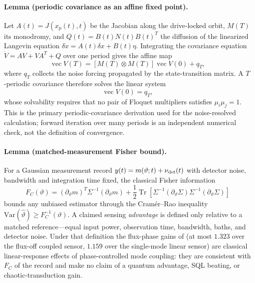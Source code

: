 \documentclass[Phys]{SciPost}
\begin{document}
\paragraph{Lemma (periodic covariance as an affine fixed point).}
Let $A(t)=J(x_p(t),t)$ be the Jacobian along the drive-locked orbit, $M(T)$ its
monodromy, and $Q(t)=B(t)N(t)B(t)^T$ the diffusion of the linearized Langevin
equation $\delta\dot x=A(t)\delta x+B(t)\eta$. Integrating the covariance
equation $\dot V=AV+VA^T+Q$ over one period gives the affine map
\begin{equation}
 \operatorname{vec}V(T)=[M(T)\otimes M(T)]\operatorname{vec}V(0)+q_T,
\label{SI-eq:cov-affine}
\end{equation}
where $q_T$ collects the noise forcing propagated by the state-transition
matrix. A $T$-periodic covariance therefore solves the linear system
\begin{equation}
 [I-M(T)\otimes M(T)]\operatorname{vec}V(0)=q_T,
\label{SI-eq:cov-fixed-point}
\end{equation}
whose solvability requires that no pair of Floquet multipliers satisfies
$\mu_i\mu_j=1$. This is the primary periodic-covariance derivation used for the
noise-resolved calculation; forward iteration over many periods is an
independent numerical check, not the definition of convergence.

\paragraph{Lemma (matched-measurement Fisher bound).}
For a Gaussian measurement record $y(t)=m(\vartheta;t)+\nu_{\rm det}(t)$ with
detector noise, bandwidth and integration time fixed, the classical Fisher
information
\begin{equation}
 F_C(\vartheta)=(\partial_\vartheta m)^T\Sigma^{-1}(\partial_\vartheta m)
 +\frac12\operatorname{Tr}\!\left[\Sigma^{-1}(\partial_\vartheta\Sigma)
 \Sigma^{-1}(\partial_\vartheta\Sigma)\right]
\label{SI-eq:fisher-lemma}
\end{equation}
bounds any unbiased estimator through the Cram\'er--Rao inequality~\cite{clerk2010,braunstein1994}
$\mathrm{Var}(\hat\vartheta)\ge F_C^{-1}(\vartheta)$. A claimed sensing
\emph{advantage} is defined only relative to a matched reference---equal input
power, observation time, bandwidth, baths, and detector noise. Under that
definition the flux-phase gains of  (at most
$\num{1.323}$ over the flux-off coupled sensor, $\num{1.159}$ over the
single-mode linear sensor) are classical linear-response effects of
phase-controlled mode coupling: they are consistent with $F_C$ of the record
and make no claim of a quantum advantage, SQL beating, or
chaotic-transduction gain.
\end{document}
